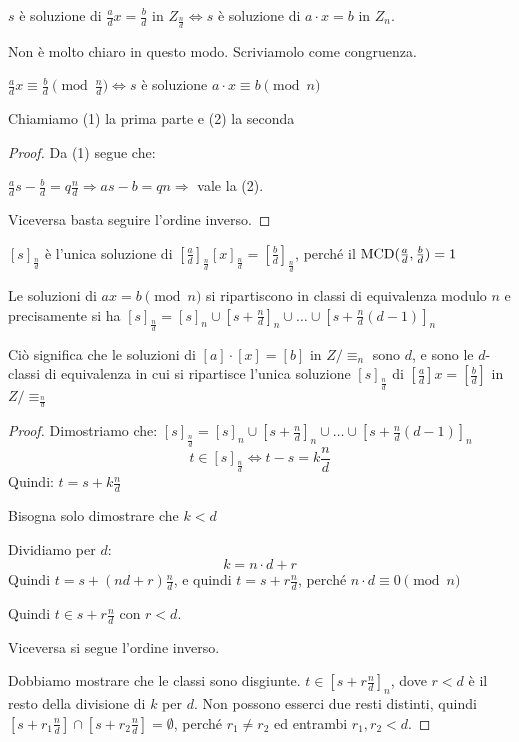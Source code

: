 \begin{enumerate}
    $s$ \`e soluzione di $\frac{a}{d} x = \frac{b}{d}$ in $Z_{\frac{n}{d}} \Leftrightarrow s$ \`e soluzione di $a \cdot x = b$ in $Z_n$.

    Non \`e molto chiaro in questo modo. Scriviamolo come congruenza.

    $\frac{a}{d} x \equiv \frac{b}{d} \pmod \frac{n}{d} \Leftrightarrow s$ \`e soluzione $a \cdot x \equiv b \pmod{n}$

    Chiamiamo (1) la prima parte e (2) la seconda
    \begin{proof}
    Da (1) segue che:

    $\frac{a}{d} s - \frac{b}{d} = q \frac{n}{d} \Rightarrow a s - b = q n \Rightarrow$ vale la (2).

    Viceversa basta seguire l'ordine inverso.
    \end{proof}
    $[s]_{\frac{n}{d}}$ \`e l'unica soluzione di $[\frac{a}{d}]_{\frac{n}{d}} [x]_{\frac{n}{d}} = [\frac{b}{d}]_{\frac{n}{d}}$, perch\'e il $\operatorname{MCD}(\frac{a}{d}, \frac{b}{d}) = 1$

    Le soluzioni di $ax = b \pmod{n}$ si ripartiscono in classi di equivalenza modulo $n$ e precisamente si ha $[s]_{\frac{n}{d}} = [s]_{n} \cup [s + \frac{n}{d}]_{n} \cup \dots \cup [s + \frac{n}{d}(d-1)]_{n}$

    Ci\`o significa che le soluzioni di $[a] \cdot [x] = [b]$ in $Z / \equiv_n$ sono $d$, e sono le $d$-classi di equivalenza in cui si ripartisce l'unica soluzione $[s]_{\frac{n}{d}}$ di $[\frac{a}{d}] x = [\frac{b}{d}]$ in $Z / \equiv_{\frac{n}{d}}$

    \begin{proof}
    Dimostriamo che: $[s]_{\frac{n}{d}} = [s]_{n} \cup [s + \frac{n}{d}]_{n} \cup \dots \cup [s + \frac{n}{d}(d-1)]_{n}$
    \[
    t \in [s]_{\frac{n}{d}} \Leftrightarrow t - s = k \frac{n}{d}
    \]
    Quindi: $t = s + k \frac{n}{d}$

    Bisogna solo dimostrare che $k < d$

    Dividiamo per $d$:
    \[
    k = n \cdot d + r
    \]
    Quindi $t = s + (n d + r) \frac{n}{d}$, e quindi
    $t = s + r \frac{n}{d}$, perch\'e $n \cdot d \equiv 0 \pmod{n}$

    Quindi $t \in s + r \frac{n}{d}$ con $r < d$.

    Viceversa si segue l'ordine inverso.

    Dobbiamo mostrare che le classi sono disgiunte. $t \in [s + r \frac{n}{d}]_{n}$, dove $r < d$ \`e il resto della divisione di $k$ per $d$. Non possono esserci due resti distinti, quindi $[s + r_1 \frac{n}{d}] \cap [s + r_2 \frac{n}{d}] = \emptyset$, perch\'e $r_1 \neq r_2$ ed entrambi $r_1, r_2 < d$.
    \end{proof}
\end{enumerate}

